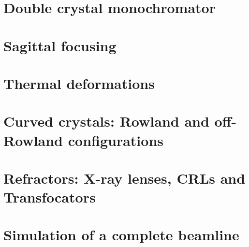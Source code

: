 \documentclass{ol-softwaremanual}
\begin{document}
\newpage
\section{Double crystal monochromator}



\newpage
\section{Sagittal focusing}



\newpage
\section{Thermal deformations}



\newpage
\section{Curved crystals: Rowland and off-Rowland configurations}



\newpage
\section{Refractors: X-ray lenses, CRLs and Transfocators}




\newpage
\section{Simulation of a complete beamline}






\end{document}
